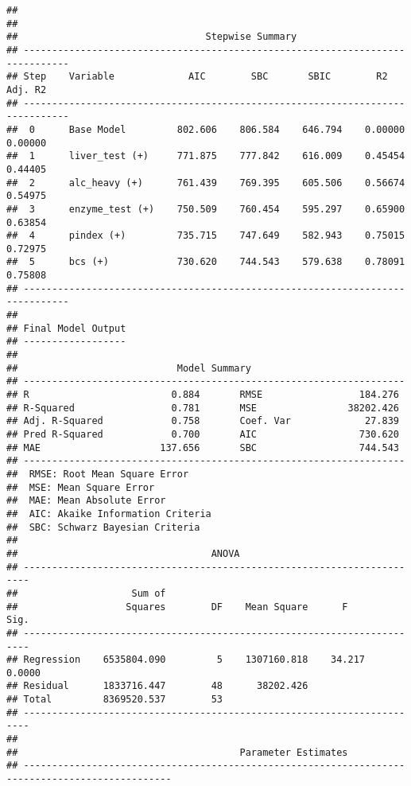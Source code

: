 \documentclass[
]{article}
\begin{document}
\begin{verbatim}
## 
## 
##                                 Stepwise Summary                                
## ------------------------------------------------------------------------------
## Step    Variable             AIC        SBC       SBIC        R2       Adj. R2 
## ------------------------------------------------------------------------------
##  0      Base Model         802.606    806.584    646.794    0.00000    0.00000 
##  1      liver_test (+)     771.875    777.842    616.009    0.45454    0.44405 
##  2      alc_heavy (+)      761.439    769.395    605.506    0.56674    0.54975 
##  3      enzyme_test (+)    750.509    760.454    595.297    0.65900    0.63854 
##  4      pindex (+)         735.715    747.649    582.943    0.75015    0.72975 
##  5      bcs (+)            730.620    744.543    579.638    0.78091    0.75808 
## ------------------------------------------------------------------------------
## 
## Final Model Output 
## ------------------
## 
##                            Model Summary                            
## -------------------------------------------------------------------
## R                         0.884       RMSE                 184.276 
## R-Squared                 0.781       MSE                38202.426 
## Adj. R-Squared            0.758       Coef. Var             27.839 
## Pred R-Squared            0.700       AIC                  730.620 
## MAE                     137.656       SBC                  744.543 
## -------------------------------------------------------------------
##  RMSE: Root Mean Square Error 
##  MSE: Mean Square Error 
##  MAE: Mean Absolute Error 
##  AIC: Akaike Information Criteria 
##  SBC: Schwarz Bayesian Criteria 
## 
##                                  ANOVA                                  
## -----------------------------------------------------------------------
##                    Sum of                                              
##                   Squares        DF    Mean Square      F         Sig. 
## -----------------------------------------------------------------------
## Regression    6535804.090         5    1307160.818    34.217    0.0000 
## Residual      1833716.447        48      38202.426                     
## Total         8369520.537        53                                    
## -----------------------------------------------------------------------
## 
##                                       Parameter Estimates                                        
## ------------------------------------------------------------------------------------------------

\end{verbatim}
\end{document}
